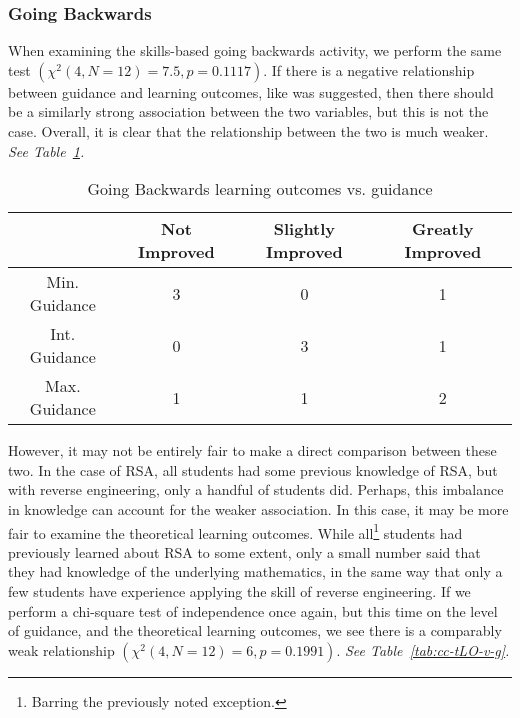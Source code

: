        \subsubsection*{Going Backwards}
            When examining the skills-based going backwards activity, we perform the same test $(\chi^2(4, N=12)=7.5,  p = 0.1117)$. 
            If there is a negative relationship between guidance and learning outcomes, like was suggested, then there should be a similarly strong association between the two variables, but this is not the case. 
            Overall, it is clear that the relationship between the two is much weaker. \emph{See Table~\ref{tab:gb-LO-v-g}.} 

            \begin{table}
            \begin{center}
                \begin{tabular}{|c|c|c|c|}
                    \hline
                        & Not Improved & Slightly Improved & Greatly Improved \\
                    \hline
                    Min. Guidance & 3 & 0 & 1\\
                    \hline
                    Int. Guidance & 0 & 3 & 1\\
                    \hline
                    Max. Guidance & 1 & 1 & 2\\
                    \hline
                \end{tabular}

                \caption{Going Backwards learning outcomes vs. guidance}\label{tab:gb-LO-v-g}
            \end{center}
            \end{table}

        However, it may not be entirely fair to make a direct comparison between these two. 
        In the case of RSA, all students had some previous knowledge of RSA, but with reverse engineering, only a handful of students did. 
        Perhaps, this imbalance in knowledge can account for the weaker association. 
        In this case, it may be more fair to examine the theoretical learning outcomes. 
        While all\footnote{Barring the previously noted exception.} students had previously learned about RSA to some extent, only a small number said that they had knowledge of the underlying mathematics, in the same way that only a few students have experience applying the skill of reverse engineering. 
        If we perform a chi-square test of independence once again, but this time on the level of guidance, and the theoretical learning outcomes, we see there is a comparably weak relationship $(\chi^2(4, N=12)=6,  p = 0.1991)$. \emph{See Table~\ref{tab:cc-tLO-v-g}.}

